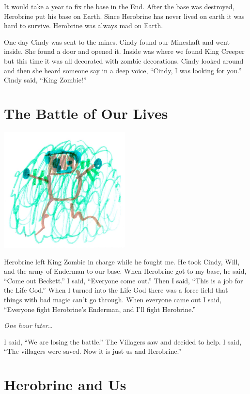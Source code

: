 \documentclass[12pt,twoside]{krantz}
\begin{document}
It would take a year to fix the base in the End. After the base was
destroyed, Herobrine put his base on Earth. Since Herobrine has never
lived on earth it was hard to survive. Herobrine was always mad on
Earth.

One day Cindy was sent to the mines. Cindy found our Mineshaft and went
inside. She found a door and opened it. Inside was where we found King
Creeper but this time it was all decorated with zombie decorations.
Cindy looked around and then she heard someone say in a deep voice,
``Cindy, I was looking for you.'' Cindy said, ``King Zombie!''

\hypertarget{the-battle-of-our-lives}{%
\section{The Battle of Our Lives}\label{the-battle-of-our-lives}}

\includegraphics[width=2.60417in,height=\textheight]{img/herobrine-returns/13-forcefield.jpg}

Herobrine left King Zombie in charge while he fought me. He took Cindy,
Will, and the army of Enderman to our base. When Herobrine got to my
base, he said, ``Come out Beckett.'' I said, ``Everyone come out.'' Then
I said, ``This is a job for the Life God.'' When I turned into the Life
God there was a force field that things with bad magic can't go through.
When everyone came out I said, ``Everyone fight Herobrine's Enderman,
and I'll fight Herobrine.''

\emph{One hour later\ldots{}}

I said, ``We are losing the battle.'' The Villagers saw and decided to
help. I said, ``The villagers were saved. Now it is just us and
Herobrine.''

\hypertarget{herobrine-and-us}{%
\section{Herobrine and Us}\label{herobrine-and-us}}
\end{document}
